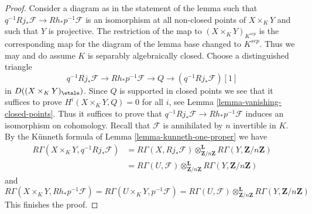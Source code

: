 \begin{proof}
\medskip\noindent
Consider a diagram as in the statement of the lemma
such that $q^{-1}Rj_*\mathcal{F} \to Rh_*p^{-1}\mathcal{F}$
is an isomorphism at all non-closed points of $X \times_K Y$
and such that $Y$ is projective.
The restriction of the map to $(X \times_K Y)_{K^{sep}}$
is the corresponding map for the diagram of the lemma
base changed to $K^{sep}$. Thus we may and do assume $K$
is separably algebraically closed. Choose a distinguished triangle
$$
q^{-1}Rj_*\mathcal{F} \to Rh_*p^{-1}\mathcal{F} \to Q \to
(q^{-1}Rj_*\mathcal{F})[1]
$$
in $D((X \times_K Y)_\etale)$. Since $Q$ is supported in
closed points we see that it suffices to prove
$H^i(X \times_K Y, Q) = 0$ for all $i$, see
Lemma \ref{lemma-vanishing-closed-points}.
Thus it suffices to prove that
$q^{-1}Rj_*\mathcal{F} \to Rh_*p^{-1}\mathcal{F}$
induces an isomorphism on cohomology. Recall that $\mathcal{F}$
is annihilated by $n$ invertible in $K$.
By the K\"unneth formula of Lemma \ref{lemma-kunneth-one-proper}
we have
\begin{align*}
R\Gamma(X \times_K Y, q^{-1}Rj_*\mathcal{F})
&=
R\Gamma(X, Rj_*\mathcal{F})
\otimes_{\mathbf{Z}/n\mathbf{Z}}^\mathbf{L}
R\Gamma(Y, \mathbf{Z}/n\mathbf{Z}) \\
& =
R\Gamma(U, \mathcal{F})
\otimes_{\mathbf{Z}/n\mathbf{Z}}^\mathbf{L}
R\Gamma(Y, \mathbf{Z}/n\mathbf{Z})
\end{align*}
and
$$
R\Gamma(X \times_K Y, Rh_*p^{-1}\mathcal{F}) =
R\Gamma(U \times_K Y, p^{-1}\mathcal{F}) =
R\Gamma(U, \mathcal{F})
\otimes_{\mathbf{Z}/n\mathbf{Z}}^\mathbf{L}
R\Gamma(Y, \mathbf{Z}/n\mathbf{Z})
$$
This finishes the proof.
\end{proof}